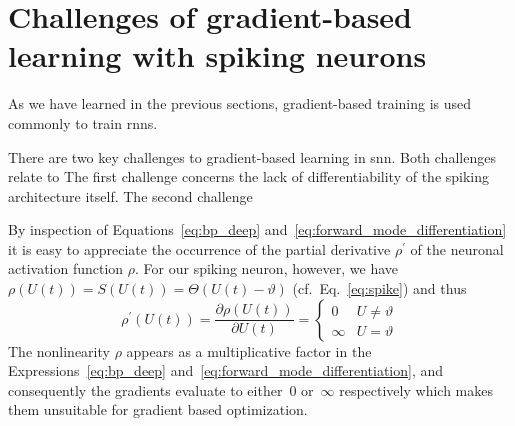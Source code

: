 \documentclass[journal,onecolumn,11pt]{IEEEtran}
\begin{document}
\section{Challenges of gradient-based learning with spiking neurons}

As we have learned in the previous sections, gradient-based training is used commonly to train \glspl{rnn}.  

There are two key challenges to gradient-based learning in \gls{snn}.
Both challenges relate to 
The first challenge concerns the lack of differentiability of the spiking architecture itself. 
The second challenge 

By inspection of Equations~\eqref{eq:bp_deep} and~\eqref{eq:forward_mode_differentiation} it is easy to appreciate the occurrence of the partial derivative $\rho^\prime$ of the neuronal activation function $\rho$.
For our spiking neuron, however, we have $\rho(U(t))=S(U(t))=\Theta(U(t)-\vartheta)$ (cf.\ Eq.~\eqref{eq:spike}) and thus 
\begin{equation}
\rho^\prime(U(t))=\frac{\partial \rho(U(t))}{\partial U(t)}=
\begin{cases}
0 & U\ne\vartheta\\
\infty & U=\vartheta
\end{cases}
\end{equation}
The nonlinearity $\rho$ appears as a multiplicative factor in the Expressions~\eqref{eq:bp_deep} and~\eqref{eq:forward_mode_differentiation}, and consequently the gradients evaluate to either~$0$ or~$\infty$ respectively which makes them unsuitable for gradient based optimization.
\end{document}
